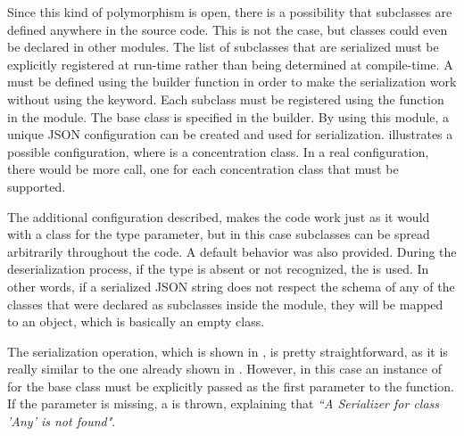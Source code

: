 Since this kind of polymorphism is open, there is a possibility that subclasses are defined anywhere in the source code. This is not the case, but classes could even be declared in other modules. The list of subclasses that are serialized must be explicitly registered at run-time rather than being determined at compile-time. A  must be defined using the  builder function in order to make the serialization work without using the  keyword. Each subclass must be registered using the  function in the module. The base class is specified in the  builder. By using this module, a unique JSON configuration can be created and used for serialization.  illustrates a possible configuration, where  is a concentration class. In a real configuration, there would be more  call, one for each concentration class that must be supported.\newline

The additional configuration described, makes the code work just as it would with a  class for the  type parameter, but in this case subclasses can be spread arbitrarily throughout the code. A default behavior was also provided. During the deserialization process, if the type is  absent or not recognized, the  is used. In other words, if a serialized JSON string does not respect the schema of any of the classes that were declared as subclasses inside the module, they will be mapped to an  object, which is basically an empty class.\newline



The serialization operation, which is shown in , is pretty straightforward, as it is really similar to the one already shown in .
However, in this case an instance of  for the base class  must be explicitly passed as the first parameter to the  function. If the parameter is missing, a  is thrown, explaining that \textit{``A Serializer for class 'Any' is not found"}.\newline

